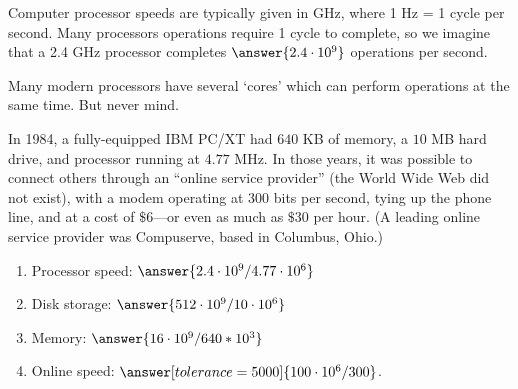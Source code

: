 \documentclass[nooutcomes]{ximera}
\begin{document}
\begin{problem}
Computer processor speeds are typically given in GHz, where 1 Hz = 1 cycle per second.  Many processors operations require 1 cycle to complete, so we imagine that a 2.4 GHz processor completes $\answer{2.4\cdot10^9}$ operations per second.  

Many modern processors have several `cores' which can perform operations at the same time.  But never mind.  

In 1984, a fully-equipped IBM PC/XT had $640$ KB of memory, a $10$ MB hard drive, and processor running at $4.77$ MHz.  In those years, it was possible to connect others through an ``online service provider'' (the World Wide Web did not exist), with a modem operating at 300 bits per second, tying up the phone line, and at a cost of $\$6$---or even as much as $\$30$ per hour.  (A leading online service provider was Compuserve, based in Columbus, Ohio.)  

\begin{enumerate}
\item Processor speed: $\answer{2.4\cdot10^9/4.77\cdot10^6}$
\item Disk storage: $\answer{512\cdot10^9/10\cdot10^6}$
\item Memory: $\answer{16\cdot10^9/640*10^3}$
\item Online speed: $\answer[tolerance=5000]{100\cdot10^6/300}$. 
\end{enumerate}
\end{problem}
\end{document}
